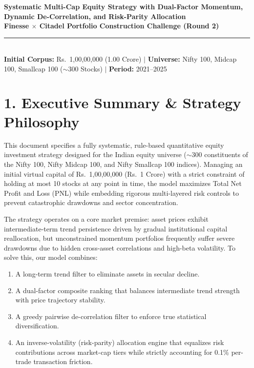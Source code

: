 \documentclass[11pt,a4paper]{article}
\begin{document}
\begin{center}
    {\LARGE \textbf{Systematic Multi-Cap Equity Strategy with Dual-Factor Momentum, Dynamic De-Correlation, and Risk-Parity Allocation}}\\[0.8em]
    {\large \textbf{Finesse $\times$ Citadel Portfolio Construction Challenge (Round 2)}}\\[0.5em]
    \rule{\linewidth}{0.8pt}\\[0.4em]
    \textbf{Initial Corpus:} Rs.~1,00,00,000 (1.00 Crore) \quad $\mid$ \quad \textbf{Universe:} Nifty 100, Midcap 100, Smallcap 100 ($\sim$300 Stocks) \quad $\mid$ \quad \textbf{Period:} 2021--2025
\end{center}

\vspace{0.5em}

\section{1. Executive Summary \& Strategy Philosophy}
This document specifies a fully systematic, rule-based quantitative equity investment strategy designed for the Indian equity universe ($\sim$300 constituents of the Nifty 100, Nifty Midcap 100, and Nifty Smallcap 100 indices). Managing an initial virtual capital of Rs.~1,00,00,000 (Rs.~1 Crore) with a strict constraint of holding at most 10 stocks at any point in time, the model maximizes Total Net Profit and Loss (PNL) while embedding rigorous multi-layered risk controls to prevent catastrophic drawdowns and sector concentration.

The strategy operates on a core market premise: asset prices exhibit intermediate-term trend persistence driven by gradual institutional capital reallocation, but unconstrained momentum portfolios frequently suffer severe drawdowns due to hidden cross-asset correlations and high-beta volatility. To solve this, our model combines:
\begin{enumerate}[leftmargin=1.8em, itemsep=0.1em]
    \item A long-term trend filter to eliminate assets in secular decline.
    \item A dual-factor composite ranking that balances intermediate trend strength with price trajectory stability.
    \item A greedy pairwise de-correlation filter to enforce true statistical diversification.
    \item An inverse-volatility (risk-parity) allocation engine that equalizes risk contributions across market-cap tiers while strictly accounting for 0.1\% per-trade transaction friction.
\end{enumerate}
\end{document}
